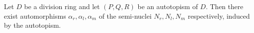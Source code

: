 Let $D$ be a division ring and let $(P, Q, R)$ be an autotopism of $D$. Then there exist automorphisms $\alpha_r, \alpha_l, \alpha_m$ of the semi-nuclei $N_r, N_l, N_m$ respectively, induced by the autotopism.
